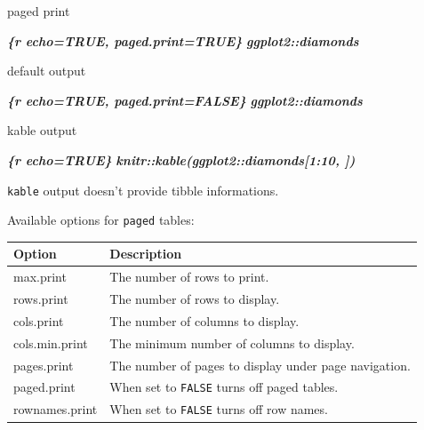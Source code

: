 \documentclass[
  a4paper,
  twoside,
  openright]{book}
\newenvironment{Shaded}{\begin{snugshade}}{\end{snugshade}}
\newcommand{\InformationTok}[1]{\textcolor[rgb]{0.56,0.35,0.01}{\textbf{\textit{#1}}}}
\newcommand{\NormalTok}[1]{#1}
\theoremstyle{definition}
\theoremstyle{definition}
\theoremstyle{definition}
\theoremstyle{definition}
\theoremstyle{remark}
\begin{document}
\begin{Shaded}
\begin{Highlighting}[]
\NormalTok{paged print}

\InformationTok{\textasciigrave{}\textasciigrave{}\textasciigrave{}\{r echo=TRUE, paged.print=TRUE\}}
\InformationTok{ggplot2::diamonds}
\InformationTok{\textasciigrave{}\textasciigrave{}\textasciigrave{}}

\NormalTok{default output}

\InformationTok{\textasciigrave{}\textasciigrave{}\textasciigrave{}\{r echo=TRUE, paged.print=FALSE\}}
\InformationTok{ggplot2::diamonds}
\InformationTok{\textasciigrave{}\textasciigrave{}\textasciigrave{}}

\NormalTok{kable output}

\InformationTok{\textasciigrave{}\textasciigrave{}\textasciigrave{}\{r echo=TRUE\}}
\InformationTok{knitr::kable(ggplot2::diamonds[1:10, ])}
\InformationTok{\textasciigrave{}\textasciigrave{}\textasciigrave{}}
\end{Highlighting}
\end{Shaded}

\texttt{kable} output doesn't provide tibble informations.

Available options for \texttt{paged} tables:

\begin{longtable}[]{@{}
  >{\raggedright\arraybackslash}p{}
  >{\raggedright\arraybackslash}p{}@{}}
\toprule\noalign{}
\begin{minipage}[b]{\linewidth}\raggedright
Option
\end{minipage} & \begin{minipage}[b]{\linewidth}\raggedright
Description
\end{minipage} \\
\midrule\noalign{}
\endhead
\bottomrule\noalign{}
\endlastfoot
max.print & The number of rows to print. \\
rows.print & The number of rows to display. \\
cols.print & The number of columns to display. \\
cols.min.print & The minimum number of columns to display. \\
pages.print & The number of pages to display under page navigation. \\
paged.print & When set to \texttt{FALSE} turns off paged tables. \\
rownames.print & When set to \texttt{FALSE} turns off row names. \\
\end{longtable}
\end{document}
